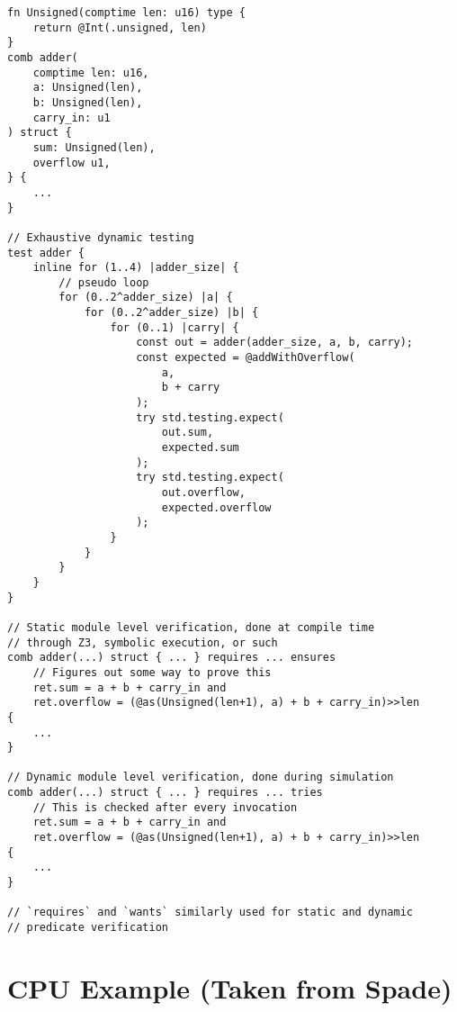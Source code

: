 \documentclass[10pt]{article}
\begin{document}
\begin{verbatim}
fn Unsigned(comptime len: u16) type {
    return @Int(.unsigned, len)
}
comb adder(
    comptime len: u16,
    a: Unsigned(len),
    b: Unsigned(len),
    carry_in: u1
) struct {
    sum: Unsigned(len),
    overflow u1,
} {
    ...
}

// Exhaustive dynamic testing
test adder {
    inline for (1..4) |adder_size| {
        // pseudo loop
        for (0..2^adder_size) |a| {
            for (0..2^adder_size) |b| {
                for (0..1) |carry| {
                    const out = adder(adder_size, a, b, carry);
                    const expected = @addWithOverflow(
                        a,
                        b + carry
                    );
                    try std.testing.expect(
                        out.sum,
                        expected.sum
                    );
                    try std.testing.expect(
                        out.overflow,
                        expected.overflow
                    );
                }
            }
        }
    }
}

// Static module level verification, done at compile time
// through Z3, symbolic execution, or such
comb adder(...) struct { ... } requires ... ensures 
    // Figures out some way to prove this
    ret.sum = a + b + carry_in and
    ret.overflow = (@as(Unsigned(len+1), a) + b + carry_in)>>len 
{
    ...
}

// Dynamic module level verification, done during simulation
comb adder(...) struct { ... } requires ... tries 
    // This is checked after every invocation
    ret.sum = a + b + carry_in and
    ret.overflow = (@as(Unsigned(len+1), a) + b + carry_in)>>len 
{
    ...
}

// `requires` and `wants` similarly used for static and dynamic
// predicate verification
\end{verbatim}


\section{CPU Example (Taken from Spade)}
\end{document}
